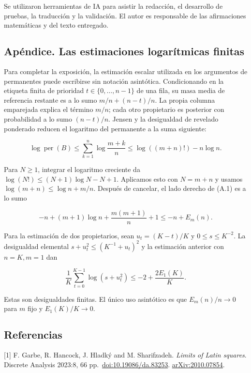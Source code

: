 \documentclass[spanish,11pt,a4paper]{article}
\begin{document}
Se utilizaron herramientas de IA para asistir la redacción, el desarrollo de pruebas, la traducción y la validación. El autor es responsable de las afirmaciones matemáticas y del texto entregado.

\subsection{Apéndice. Las estimaciones logarítmicas finitas}\label{apuxe9ndice.-las-estimaciones-logaruxedtmicas-finitas}

Para completar la exposición, la estimación escalar utilizada en los argumentos de permanentes puede escribirse sin notación asintótica. Condicionando en la etiqueta finita de prioridad \(t\in\{0,\ldots,n-1\}\) de una fila, su masa media de referencia restante es a lo sumo \(m/n+(n-t)/n\). La propia columna emparejada explica el término \(m/n\); cada otro propietario es posterior con probabilidad a lo sumo \((n-t)/n\). Jensen y la desigualdad de revelado ponderado reducen el logaritmo del permanente a la suma siguiente:

\nopagebreak[4]
\[\log\operatorname{per}(B)\le\sum_{k=1}^n\log\frac{m+k}{n}
\le\log((m+n)!)-n\log n.\tag{A.1}\]

Para \(N\ge1\), integrar el logaritmo creciente da \(\log(N!)\le(N+1)\log N-N+1\). Aplicamos esto con \(N=m+n\) y usamos \(\log(m+n)\le\log n+m/n\). Después de cancelar, el lado derecho de (A.1) es a lo sumo

\nopagebreak[4]
\[-n+(m+1)\log n+\frac{m(m+1)}n+1\le-n+E_m(n).\tag{A.2}\]

Para la estimación de dos propietarios, sean \(u_t=(K-t)/K\) y \(0\le s\le K^{-2}\). La desigualdad elemental \(s+u_t^2\le(K^{-1}+u_t)^2\) y la estimación anterior con \(n=K,m=1\) dan

\nopagebreak[4]
\[\frac1K\sum_{t=0}^{K-1}\log(s+u_t^2)
\le-2+\frac{2E_1(K)}K.\tag{A.3}\]

Estas son desigualdades finitas. El único uso asintótico es que \(E_m(n)/n\to0\) para \(m\) fijo y \(E_1(K)/K\to0\).

\subsection{Referencias}\label{referencias}
\begingroup\small

{[}1{]} F. Garbe, R. Hancock, J. Hladký and M. Sharifzadeh. \emph{Limits of Latin squares}. Discrete Analysis 2023:8, 66 pp.~\href{https://doi.org/10.19086/da.83253}{doi:10.19086/da.83253}. \href{https://arxiv.org/abs/2010.07854}{arXiv:2010.07854}.
\end{document}

